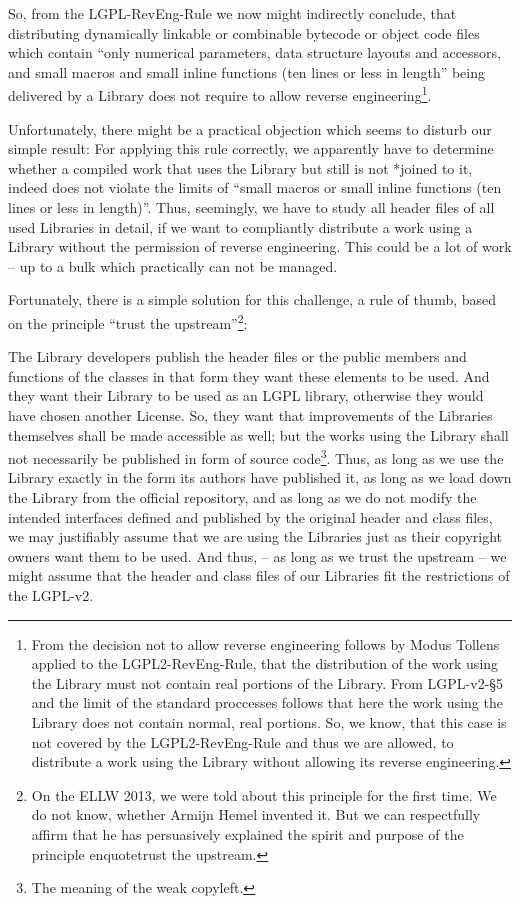 So, from the LGPL-RevEng-Rule we now might indirectly conclude, that
distributing dynamically linkable or combinable bytecode or object code files
which contain \enquote{only numerical parameters, data structure layouts and
accessors, and small macros and small inline functions (ten lines or less in
length} being delivered by a Library does not require to allow reverse
engineering\footnote{From the decision not to allow reverse engineering follows
by Modus Tollens applied to the LGPL2-RevEng-Rule, that the distribution of the
work using the Library must not contain real portions of the Library. From
LGPL-v2-§5 and the limit of the standard proccesses follows that here the work
using the Library does not contain normal, real portions. So, we know, that this
case is not covered by the LGPL2-RevEng-Rule and thus we are allowed, to
distribute a work using the Library without allowing its reverse engineering.}.

Unfortunately, there might be a practical objection which seems to disturb our
simple result: For applying this rule correctly, we apparently have to determine
whether a compiled work that uses the Library but still is not *joined to it,
indeed does not violate the limits of \enquote{small macros or small inline
functions (ten lines or less in length)}. Thus, seemingly, we have to study all
header files of all used Libraries in detail, if we want to compliantly
distribute a work using a Library without the permission of reverse engineering.
This could be a lot of work -- up to a bulk which practically can not be
managed.

Fortunately, there is a simple solution for this challenge, a rule of thumb,
based on the principle \enquote{trust the upstream}\footnote{On the ELLW 2013,
we were told about this principle for the first time. We do not know, whether
Armijn Hemel invented it. But we can respectfully affirm that he has
persuasively explained the spirit and purpose of the principle enquote{trust the
upstream}.}:

The Library developers publish the header files or the public members and
functions of the classes in that form they want these elements to be used.
And they want their Library to be used as an LGPL library, otherwise they would
have chosen another License. So, they want that improvements of the Libraries
themselves shall be made accessible as well; but the works using the Library
shall not necessarily be published in form of source code\footnote{The meaning
of the weak copyleft.}. Thus, as long as we use the Library exactly in the form
its authors have published it, as long as we load down the Library from the
official repository, and as long as we do not modify the intended interfaces
defined and published by the original header and class files, we may justifiably
assume that we are using the Libraries just as their copyright owners want them
to be used. And thus, -- as long as we trust the upstream -- we might assume
that the header and class files of our Libraries fit the restrictions of the
LGPL-v2.

